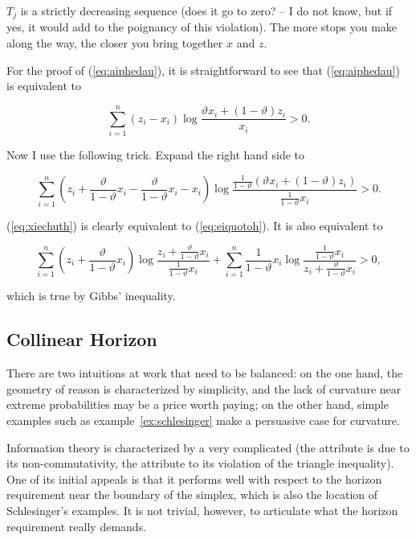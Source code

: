\documentclass[11pt]{article}
\begin{document}
$T_{j}$ is a strictly decreasing sequence (does it go to zero? -- I do
not know, but if yes, it would add to the poignancy of this
violation). The more stops you make along the way, the closer you
bring together $x$ and $z$.

For the proof of (\ref{eq:aiphedau}), it is straightforward to see
that (\ref{eq:aiphedau}) is equivalent to

\begin{equation}
  \label{eq:eiquotoh}
  \sum_{i=1}^{n}(z_{i}-x_{i})\log\frac{\vartheta{}x_{i}+(1-\vartheta)z_{i}}{x_{i}}>0.
\end{equation}

Now I use the following trick. Expand the right hand side to

\begin{equation}
  \label{eq:xiechuth}
  \sum_{i=1}^{n}\left(z_{i}+\frac{\vartheta}{1-\vartheta}x_{i}-\frac{\vartheta}{1-\vartheta}x_{i}-x_{i}\right)\log\frac{\frac{1}{1-\vartheta}\left(\vartheta{}x_{i}+(1-\vartheta)z_{i}\right)}{\frac{1}{1-\vartheta}x_{i}}>0.
\end{equation}

(\ref{eq:xiechuth}) is clearly equivalent to (\ref{eq:eiquotoh}). It
is also equivalent to

\begin{equation}
  \label{eq:ohrohshi}
  \sum_{i=1}^{n}\left(z_{i}+\frac{\vartheta}{1-\vartheta}x_{i}\right)\log\frac{z_{i}+\frac{\vartheta}{1-\vartheta}x_{i}}{\frac{1}{1-\vartheta}x_{i}}+
  \sum_{i=1}^{n}\frac{1}{1-\vartheta}x_{i}\log\frac{\frac{1}{1-\vartheta}x_{i}}{z_{i}+\frac{\vartheta}{1-\vartheta}x_{i}}>0,
\end{equation}

which is true by Gibbs' inequality.


\subsection{Collinear Horizon}
\label{subsec:colhor}

There are two intuitions at work that need to be balanced: on the one
hand, the geometry of reason is characterized by simplicity, and the
lack of curvature near extreme probabilities may be a price worth
paying; on the other hand, simple examples such as
example~\ref{ex:schlesinger} make a persuasive case for curvature.

Information theory is characterized by a very complicated
 (the attribute  is due to its
non-commutativity, the attribute  to its violation of the
triangle inequality). One of its initial appeals is that it performs
well with respect to the horizon requirement near the boundary of the
simplex, which is also the location of Schlesinger's examples. It is
not trivial, however, to articulate what the horizon requirement
really demands.
\end{document}
